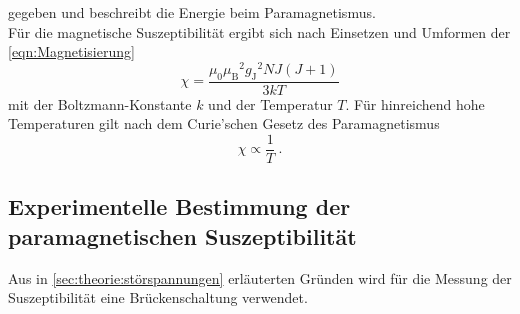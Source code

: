     gegeben und beschreibt die Energie beim Paramagnetismus.\\
    Für die magnetische Suszeptibilität ergibt sich nach Einsetzen und Umformen der \autoref{eqn:Magnetisierung}
    \begin{equation}
        \label{eqn:chi_T}
        \chi = \frac{\mu_0 {\mu_\text{B}}^2 {g_\text{J}}^2 N J (J+1)}{3kT}
    \end{equation}
    mit der Boltzmann-Konstante $k$ und der Temperatur $T$.
    Für hinreichend hohe Temperaturen gilt nach dem Curie'schen Gesetz des Paramagnetismus
    \begin{equation*}
        \chi \propto \frac{1}{T} \ .
    \end{equation*}

\subsection{Experimentelle Bestimmung der paramagnetischen Suszeptibilität}
    Aus in \autoref{sec:theorie:störspannungen} erläuterten Gründen wird
    für die Messung der Suszeptibilität eine Brückenschaltung verwendet.

